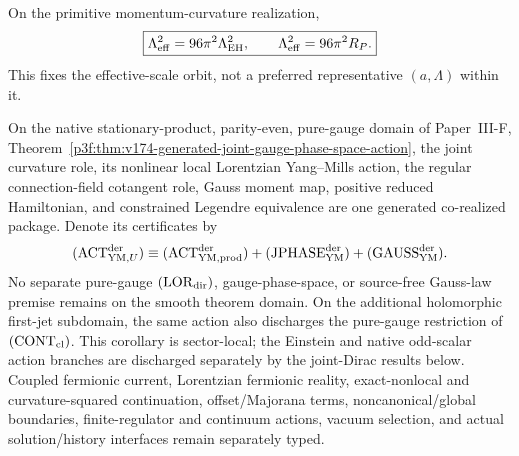 \documentclass[12pt,a4paper]{article}
\begin{document}
\begin{corollary}
\label{p3e:cor:v164-newton-fixes-profile-orbit}
On the primitive momentum-curvature realization,
\[
 \boxed{
 \Lambda_{\rm eff}^2=96\pi^2\Lambda_{\rm EH}^2,
 \qquad
 \Lambda_{\rm eff}^2=96\pi^2R_P.}
\]
This fixes the effective-scale orbit, not a preferred representative
\((a,\Lambda)\) within it.
\end{corollary}


\begin{corollary}
\label{p3e:cor:v174-yang-mills-action-derived-later}
On the native stationary-product, parity-even, pure-gauge domain of
Paper~III-F,
Theorem~\ref{p3f:thm:v174-generated-joint-gauge-phase-space-action}, the
joint curvature role, its nonlinear local Lorentzian Yang--Mills action, the
regular connection-field cotangent role, Gauss moment map, positive reduced
Hamiltonian, and constrained Legendre equivalence are one generated
co-realized package.  Denote its certificates by
\[
 (\mathrm{ACT}_{{\rm YM},U}^{\rm der})
 \equiv(\mathrm{ACT}_{\rm YM,prod}^{\rm der})
 +(\mathrm{JPHASE}_{\rm YM}^{\rm der})
 +(\mathrm{GAUSS}_{\rm YM}^{\rm der}).
\]
No separate pure-gauge \((\mathrm{LOR}_{\rm dir})\), gauge-phase-space, or
source-free Gauss-law premise remains on the smooth theorem domain.  On the
additional holomorphic first-jet subdomain, the same action also discharges the
pure-gauge restriction of \((\mathrm{CONT}_{\rm cl})\).  This
corollary is sector-local; the Einstein and native odd-scalar action branches
are discharged separately by the joint-Dirac results below.  Coupled
fermionic current, Lorentzian fermionic reality, exact-nonlocal and
curvature-squared continuation, offset/Majorana terms, noncanonical/global
boundaries, finite-regulator and continuum actions, vacuum selection, and
actual solution/history interfaces remain separately typed.
\end{corollary}
\end{document}
